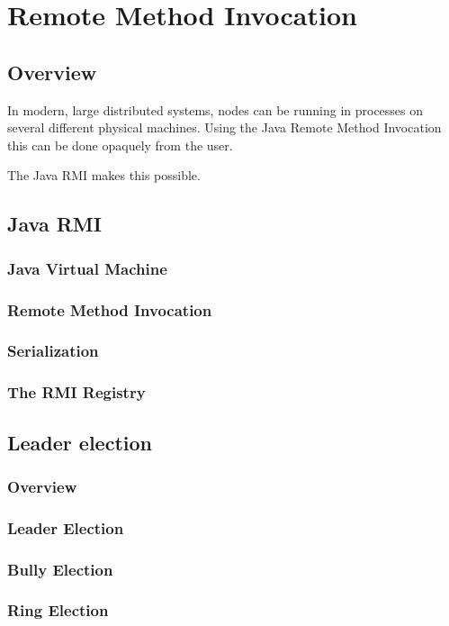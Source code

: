 \chapter{Remote Method Invocation}
\section{Overview}
In modern, large distributed systems, nodes can be running in processes on several different physical machines. Using the Java Remote Method Invocation this can be done opaquely from the user. 

The Java RMI makes this possible. 

\section{Java RMI}
\subsection{Java Virtual Machine}
\subsection{Remote Method Invocation}

\subsection{Serialization}

\subsection{The RMI Registry}

\section{Leader election}
\subsection{Overview}

\subsection{Leader Election}

\subsection{Bully Election}

\subsection{Ring Election}





